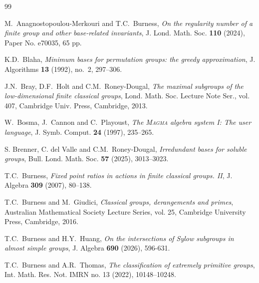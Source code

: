 \documentclass[twoside,a4paper,reqno,11pt]{amsart}
\newcommand{\<}{\langle}
\renewcommand{\>}{\rangle}
\newcommand{\cmrd}{\textcolor{blue}}
\theoremstyle{definition}
\begin{document}


\begin{thebibliography}{99}

    M.~Anagnostopoulou-Merkouri and T.C.~Burness, \textit{On the regularity number of a finite group and other base-related invariants}, J. Lond. Math. Soc. \textbf{110} (2024), Paper No. e70035, 65 pp.

    K.D.~Blaha, \emph{Minimum bases for permutation groups: the greedy approximation}, J. Algorithms {\bf 13} (1992), no.~2, 297--306.

    J.N.~Bray, D.F.~Holt and C.M.~Roney-Dougal, {\it The maximal subgroups of the low-dimensional finite classical groups}, Lond. Math. Soc. Lecture Note Ser., vol. 407, Cambridge Univ. Press, Cambridge, 2013.
    
	W.~Bosma, J.~Cannon and C.~Playoust, \emph{The {\textsc{Magma}} algebra system I: The user language}, J. Symb. Comput. \textbf{24} (1997), 235--265.
	
	S. Brenner, C. del Valle and C.M.~Roney-Dougal, \textit{Irredundant bases for soluble groups}, Bull. Lond. Math. Soc. \textbf{57} (2025), 3013–3023.

	T.C.~Burness, \textit{Fixed point ratios in actions in finite classical groups. II}, J. Algebra \textbf{309} (2007), 80–138.


	T.C.~Burness and M.~Giudici, \emph{Classical groups, derangements and primes}, Australian Mathematical Society Lecture Series, vol. 25, Cambridge University Press, Cambridge, 2016.
	
	T.C.~Burness and H.Y.~Huang, \textit{On the intersections of Sylow subgroups in almost simple groups}, J. Algebra \textbf{690} (2026), 596-631.

    T.C.~Burness and A.R.~Thomas, \textit{The classification of extremely primitive groups}, Int. Math. Res. Not. IMRN no. 13 (2022), 10148–10248.
    

\end{thebibliography}
\end{document}
